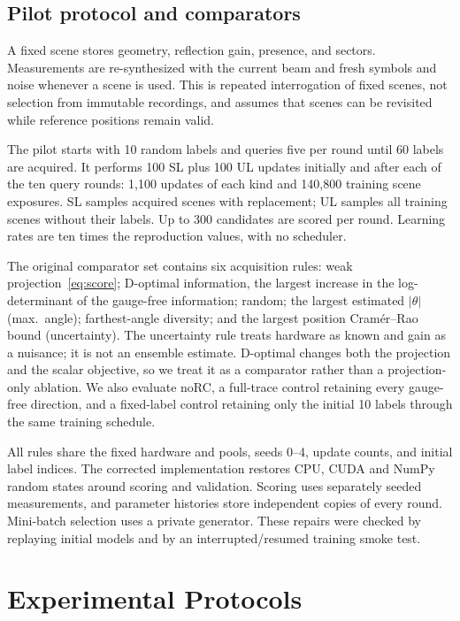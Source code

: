 \documentclass[conference]{IEEEtran}
\begin{document}
\subsection{Pilot protocol and comparators}
A fixed scene stores geometry, reflection gain, presence, and sectors. Measurements are re-synthesized with the current beam and fresh symbols and noise whenever a scene is used. This is repeated interrogation of fixed scenes, not selection from immutable recordings, and assumes that scenes can be revisited while reference positions remain valid.

The pilot starts with 10 random labels and queries five per round until 60 labels are acquired. It performs 100 SL plus 100 UL updates initially and after each of the ten query rounds: 1,100 updates of each kind and 140,800 training scene exposures. SL samples acquired scenes with replacement; UL samples all training scenes without their labels. Up to 300 candidates are scored per round. Learning rates are ten times the reproduction values, with no scheduler.

The original comparator set contains six acquisition rules: weak projection~\eqref{eq:score}; D-optimal information, the largest increase in the log-determinant of the gauge-free information; random; the largest estimated $|\theta|$ (max.\ angle); farthest-angle diversity; and the largest position Cram\'er--Rao bound (uncertainty). The uncertainty rule treats hardware as known and gain as a nuisance; it is not an ensemble estimate. D-optimal changes both the projection and the scalar objective, so we treat it as a comparator rather than a projection-only ablation. We also evaluate noRC, a full-trace control retaining every gauge-free direction, and a fixed-label control retaining only the initial 10 labels through the same training schedule.

All rules share the fixed hardware and pools, seeds 0--4, update counts, and initial label indices. The corrected implementation restores CPU, CUDA and NumPy random states around scoring and validation. Scoring uses separately seeded measurements, and parameter histories store independent copies of every round. Mini-batch selection uses a private generator. These repairs were checked by replaying initial models and by an interrupted/resumed training smoke test.

\section{Experimental Protocols}\label{sec:protocols}
\end{document}
